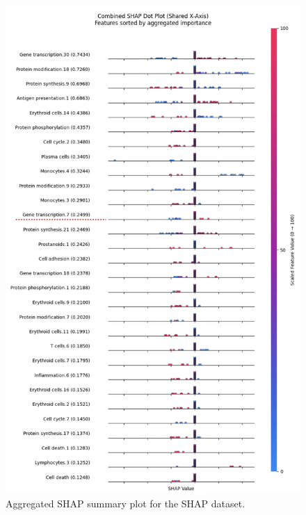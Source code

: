 \documentclass[12pt,a4paper]{report}
\begin{document}
\begin{figure}[h!]
    \centering
    \includegraphics[width=0.85\linewidth]{images/Aggregated_SHAP_RNA_uncompressed.png}
    \caption[Aggregated SHAP plot for SHAP]{Aggregated SHAP summary plot for the SHAP dataset.}
    \label{fig:rna_aggregated_shap}
\end{figure}
\end{document}
